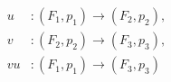 \begin{equation}
  \begin{aligned}
    u&\colon(F_1,p_1)\longrightarrow(F_2,p_2),\\
    v&\colon(F_2,p_2)\longrightarrow(F_3,p_3),\\
    vu&\colon(F_1,p_1)\longrightarrow(F_3,p_3)
  \end{aligned}
  \tag{1.4.7.2}
\end{equation}

